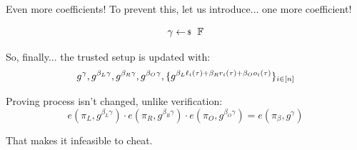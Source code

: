\documentclass{zkdl-presentation-template}
\begin{document}
    \begin{frame}{Even more coefficients!}
        To prevent this, let us introduce... one more coefficient!
        \vspace{-5pt}

        \begin{equation*}
            \gamma \leftarrowS \mathbb{F}
            \vspace{-5pt}
        \end{equation*}
        \pause

        So, finally... the trusted setup is updated with:
        \vspace{-5pt}
        \begin{equation*}
            g^{\gamma}, g^{\beta_L\gamma}, g^{\beta_R\gamma}, g^{\beta_O\gamma}, \{g^{\beta_L\ell_i(\tau) + \beta_Rr_i(\tau) + \beta_Oo_i(\tau)}\}_{i \in [n]}
            \vspace{-5pt}
        \end{equation*}
        \pause

        Proving process isn't changed, unlike verification:
        \begin{equation*}
            e(\pi_L, g^{\beta_L\gamma}) \cdot e(\pi_R, g^{\beta_R\gamma}) \cdot e(\pi_O, g^{\beta_O\gamma}) = e(\pi_{\beta}, g^{\gamma})
        \end{equation*}

        That makes it infeasible to cheat.
    \end{frame}
\end{document}

